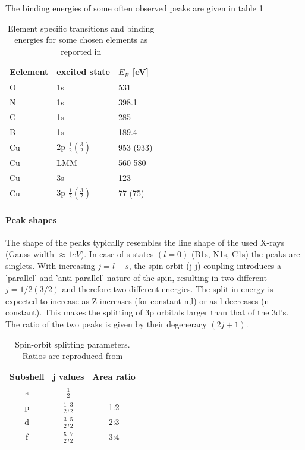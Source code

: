 The  binding energies of some often observed peaks are given in table \ref{tab:XPS-intensities}
\begin{table}\centering
 \caption{Element specific transitions and binding energies for some chosen elements as reported in \cite{wanger_handbook_1979}}
 \begin{tabular}{lll}
  Eelement & excited state & $E_B$ [eV]\\ \hline 
  O & 1s & 531\\
  N & 1s & 398.1\\
  C & 1s & 285\\
  B & 1s & 189.4 \\
  Cu & 2p $\frac{1}{2} (\frac{3}{2})$ & 953 (933) \\
  Cu & LMM & 560-580 \\
  Cu & 3s & 123\\
  Cu & 3p $\frac{1}{2} (\frac{3}{2})$ & 77 (75)\\
 \end{tabular}
\label{tab:XPS-intensities}
\end{table}

\paragraph{Peak shapes}
The shape of the peaks typically resembles the line shape of the used X-rays (Gauss width $\approx 1eV$). In case of s-states $(l=0)$ (B1s, N1s, C1s) the peaks are singlets. With increasing $j=l+s$, the spin-orbit (j-j) coupling introduces a 'parallel' and 'anti-parallel' nature of the spin, resulting in two different $j=1/2(3/2)$ and therefore two different energies. The split in energy is expected to increase as Z increases (for constant n,l) or as l decreases (n constant). This makes the splitting of 3p orbitals larger than that of the 3d's. The ratio of the two peaks is given by their degeneracy $(2j+1)$.\cite[113]{Riviere_90}
\begin{table}
\caption{Spin-orbit splitting parameters. Ratios are reproduced from \cite{Riviere_90}}
\centering
 \begin{tabular}{ccc}
 Subshell & j values & Area ratio \\ \hline
 s & $\frac{1}{2}$ & --- \\
 p & $\frac{1}{2}$,$\frac{3}{2}$ & 1:2 \\
 d & $\frac{3}{2}$,$\frac{5}{2}$ & 2:3 \\
 f & $\frac{5}{2}$,$\frac{7}{2}$ & 3:4 \\
 \end{tabular}
\end{table}

